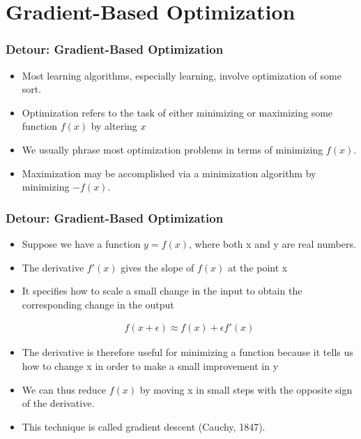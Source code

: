 \documentclass[
  shownotes,
  xcolor={svgnames},
  hyperref={colorlinks,citecolor=DarkBlue,linkcolor=DarkRed,urlcolor=DarkBlue}
  , aspectratio=169]{beamer}
\begin{document}
\section{Gradient-Based Optimization}
\begin{frame}[fragile]
\frametitle{Detour: Gradient-Based Optimization}

\begin{itemize}
\item Most learning algorithms, especially learning, involve optimization of some sort. 
\medskip
\item Optimization refers to the task of either minimizing or maximizing some function $f(x)$ by altering $x$
\medskip
\item We usually phrase most optimization problems in terms of minimizing $f(x)$. 
\medskip
\item Maximization may be accomplished via a minimization algorithm by minimizing $-f(x)$.
\end{itemize}


\end{frame}
\begin{frame}[fragile]
\frametitle{Detour: Gradient-Based Optimization}

\begin{itemize}
\item Suppose we have a function $y=f(x)$, where both x and y are real numbers.

\item The derivative $f'(x)$ gives the slope of $f(x)$ at the point x
\item  It specifies how to scale a small change in the input to obtain the corresponding change in the output

\begin{align}
f(x+\epsilon)\approx f(x)+\epsilon f'(x)
\end{align}

\item The derivative is therefore useful for minimizing a function because it tells us how to change x
in order to make a small improvement in y
\item  We can thus reduce $f(x)$ by moving x in small steps with the opposite sign of the derivative.
\item This technique is called gradient descent (Cauchy, 1847).

\end{itemize}

\end{frame}
\end{document}
